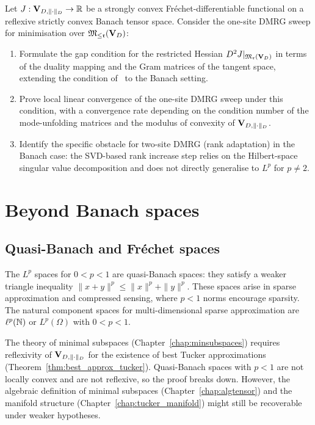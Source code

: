 \begin{problem}
\label{prob:DMRG_banach}
Let $J: \mathbf{V}_{D,\|\cdot\|_D} \to \mathbb{R}$ be a strongly convex Fréchet-differentiable
functional on a reflexive strictly convex Banach tensor space. Consider
the one-site DMRG sweep for minimisation over $\mathfrak{M}_{\leq\mathfrak{r}}(\mathbf{V}_D)$:
\begin{enumerate}
\item[\textup{(a)}] Formulate the gap condition for the restricted
    Hessian $D^2 J|_{\mathfrak{M}_{\mathfrak{r}}(\mathbf{V}_D)}$ in terms of the duality
    mapping and the Gram matrices of the tangent space, extending
    the condition of~\cite{HoltzRohwedderSchneider2012} to the Banach
    setting.
\item[\textup{(b)}] Prove local linear convergence of the one-site
    DMRG sweep under this condition, with a convergence rate
    depending on the condition number of the mode-unfolding matrices
    and the modulus of convexity of $\mathbf{V}_{D,\|\cdot\|_D}$.
\item[\textup{(c)}] Identify the specific obstacle for two-site DMRG
    (rank adaptation) in the Banach case: the SVD-based rank increase
    step relies on the Hilbert-space singular value decomposition and
    does not directly generalise to $L^p$ for $p \neq 2$.
\end{enumerate}
\end{problem}

\section{Beyond Banach spaces}
\label{sec:open:beyond}

\subsection*{Quasi-Banach and Fréchet spaces}

The $L^p$ spaces for $0 < p < 1$ are quasi-Banach spaces: they satisfy
a weaker triangle inequality $\|x+y\|^p \leq \|x\|^p + \|y\|^p$.
These spaces arise in sparse approximation and compressed sensing, where
$p < 1$ norms encourage sparsity. The natural component spaces for
multi-dimensional sparse approximation are $\ell^p(\mathbb{N})$ or
$L^p(\Omega)$ with $0 < p < 1$.

The theory of minimal subspaces (Chapter~\ref{chap:minsubspaces}) requires
reflexivity of $\mathbf{V}_{D,\|\cdot\|_D}$ for the existence of best Tucker approximations
(Theorem~\ref{thm:best_approx_tucker}). Quasi-Banach spaces with $p < 1$
are not locally convex and are not reflexive, so the proof breaks down.
However, the algebraic definition of minimal subspaces
(Chapter~\ref{chap:algtensor}) and the manifold structure
(Chapter~\ref{chap:tucker_manifold}) might still be recoverable under
weaker hypotheses.

